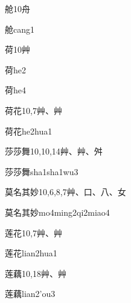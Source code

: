 \begin{entry}{舱}{10}{⾈}
  \begin{phonetics}{舱}{cang1}
  \end{phonetics}
\end{entry}

\begin{entry}{荷}{10}{⾋}
  \begin{phonetics}{荷}{he2}
  \end{phonetics}
  \begin{phonetics}{荷}{he4}
  \end{phonetics}
\end{entry}

\begin{entry}{荷花}{10,7}{⾋、⾋}
  \begin{phonetics}{荷花}{he2hua1}
  \end{phonetics}
\end{entry}

\begin{entry}{莎莎舞}{10,10,14}{⾋、⾋、⾇}
  \begin{phonetics}{莎莎舞}{sha1sha1wu3}
  \end{phonetics}
\end{entry}

\begin{entry}{莫名其妙}{10,6,8,7}{⾋、⼝、⼋、⼥}
  \begin{phonetics}{莫名其妙}{mo4ming2qi2miao4}
  \end{phonetics}
\end{entry}

\begin{entry}{莲花}{10,7}{⾋、⾋}
  \begin{phonetics}{莲花}{lian2hua1}
  \end{phonetics}
\end{entry}

\begin{entry}{莲藕}{10,18}{⾋、⾋}
  \begin{phonetics}{莲藕}{lian2'ou3}
  \end{phonetics}
\end{entry}

